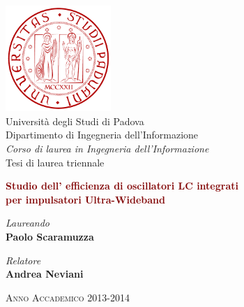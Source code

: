 \documentclass[tex/tesi.tex]{subfiles}
\begin{document}
\begin{center}
	\includegraphics[height=4cm]{images/logounipd} \\
	\vspace{0.4cm}
	Università degli Studi di Padova \\
	\vspace{0.5cm}
	Dipartimento di Ingegneria dell'Informazione \\
	\vspace{1.5cm}
	\emph{Corso di laurea in Ingegneria dell'Informazione} \\
	\vspace{0.5cm}
	Tesi di laurea triennale \\
\begin{vplace} %
	\large{\textbf{\textcolor{Maroon}{
	Studio dell' efficienza di oscillatori LC integrati \\
	per impulsatori Ultra-Wideband}}}
\end{vplace}
\end{center}

\vfill
\noindent
\begin{minipage}{0.5\textwidth}
\begin{flushleft}
	\textit{Laureando} \\
	\textbf{Paolo Scaramuzza}
\end{flushleft}
\end{minipage}
\noindent
\begin{minipage}{0.5\textwidth}
\begin{flushright}
	\textit{Relatore} \\
	\textbf{Andrea Neviani}
\end{flushright}
\end{minipage}

\vfill
\begin{center}
\small{\textsc{Anno Accademico 2013-2014}}
\end{center}
\restoregeometry{}
\end{document}
